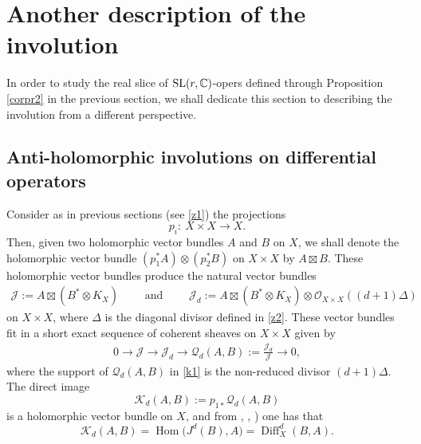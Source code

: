 \documentclass[10pt,a4paper]{amsart}
\numberwithin{equation}{section}
\begin{document}
\section{Another description of the involution}

In order to study the real slice of ${\rm SL}(r,\mathbb{C})$-opers defined through Proposition \ref{corpr2} in the previous section, we shall dedicate this section to describing the involution from a different perspective.

\subsection{Anti-holomorphic involutions on differential operators} Consider as in previous sections (see \eqref{z1}) the projections
\[
p_i\colon\ X\times X \longrightarrow X.
\]
Then, given two holomorphic vector bundles $A$ and $B$ on $X$, we shall denote the holomorphic vector bundle $(p^*_1 A)\otimes (p^*_2 B)$ on
$X\times X$ by $A\boxtimes B$.
These holomorphic vector bundles produce the natural vector bundles
\begin{eqnarray}\label{abr}
\mathcal{J} := A\boxtimes (B^*\otimes K_X)\qquad \text{ and }\qquad
\mathcal{J}_d := A\boxtimes (B^*\otimes K_X)\otimes {\mathcal O}_{X\times X}((d+1){\Delta})\end{eqnarray} on $X\times X$,
where $\Delta$ is the diagonal divisor defined in \eqref{z2}. These vector bundles fit in a short exact sequence of coherent
sheaves on $X\times X$ given by
\begin{gather}
0 \longrightarrow \mathcal{J} \longrightarrow \mathcal{J}_d \longrightarrow {\mathcal Q}_d(A, B)
 := \frac{\mathcal{J}_d}{\mathcal{J}} \longrightarrow 0,
\label{k1}
\end{gather}
where the support of ${\mathcal Q}_d(A, B)$ in \eqref{k1}
is the non-reduced divisor $(d+1){\Delta}$. The direct image
\begin{equation}\label{k2}
{\mathcal K}_d(A, B) := p_{1*} {\mathcal Q}_d(A, B)
\end{equation}
is a holomorphic vector bundle on $X$, and from \cite[Section 2.1]{BS}, \cite[p.~25, equation~(5.1)]{Bi},
\cite[Section 3.1, p.~1314]{BB}) one has that
\begin{equation}\label{k3}
{\mathcal K}_d(A, B) = \operatorname{Hom}\bigl(J^d(B), A\bigr) = \operatorname{Diff}^d_X(B, A).
\end{equation}
\end{document}
